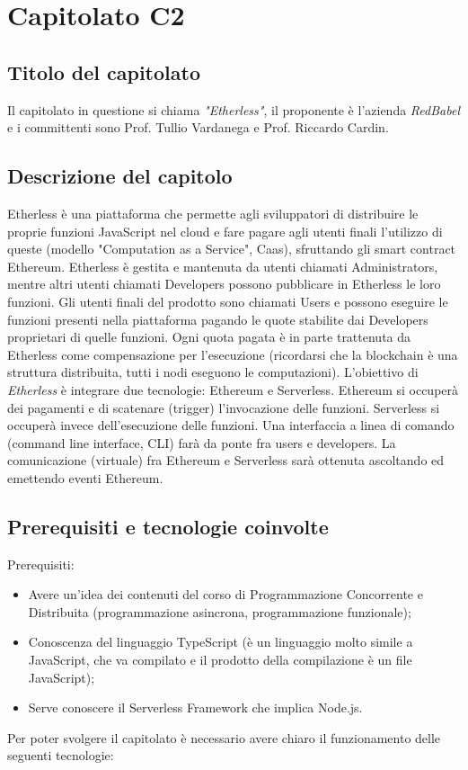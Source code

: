 \section{Capitolato C2}
\subsection{Titolo del capitolato}
Il capitolato in questione si chiama \textit{"Etherless"}, il proponente è l'azienda \textit{RedBabel} e i committenti sono Prof. Tullio Vardanega e Prof. Riccardo Cardin.

\subsection{Descrizione del capitolo}
Etherless è una piattaforma che permette agli sviluppatori di distribuire le proprie funzioni JavaScript nel cloud e fare pagare agli utenti finali l'utilizzo di queste (modello "Computation as a Service", Caas), sfruttando gli smart contract Ethereum. 
Etherless è gestita e mantenuta da utenti chiamati Administrators, mentre altri utenti chiamati Developers possono pubblicare in Etherless le loro funzioni. Gli utenti finali del prodotto sono chiamati Users e possono eseguire le funzioni presenti nella piattaforma pagando le quote stabilite dai Developers proprietari di quelle funzioni. Ogni quota pagata è in parte trattenuta da Etherless come compensazione per l'esecuzione (ricordarsi che la blockchain è una struttura distribuita, tutti i nodi eseguono le computazioni).
L'obiettivo di \textit{Etherless} è integrare due tecnologie: Ethereum e Serverless. Ethereum si occuperà dei pagamenti e di scatenare (trigger) l'invocazione delle funzioni. Serverless si occuperà invece dell'esecuzione delle funzioni. Una interfaccia a linea di comando (command line interface, CLI) farà da ponte fra users e developers. La comunicazione (virtuale) fra Ethereum e Serverless sarà ottenuta ascoltando ed emettendo eventi Ethereum.

\subsection{Prerequisiti e tecnologie coinvolte}
Prerequisiti:
\begin{itemize}
\item Avere un'idea dei contenuti del corso di Programmazione Concorrente e Distribuita (programmazione asincrona, programmazione funzionale);
\item Conoscenza del linguaggio TypeScript (\`e un linguaggio molto simile a JavaScript, che va compilato e il prodotto della compilazione \`e un file JavaScript);
\item Serve conoscere il Serverless Framework che implica Node.js.
\end{itemize}
Per poter svolgere il capitolato \`e necessario avere chiaro il funzionamento delle seguenti tecnologie:

